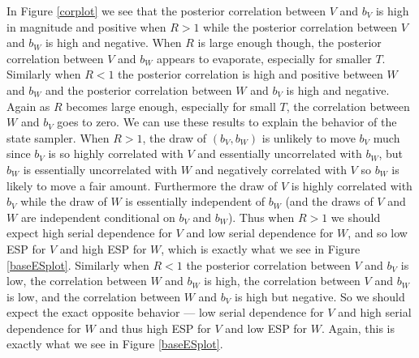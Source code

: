 \documentclass{article}
\begin{document}
In Figure \ref{corplot} we see that the posterior correlation between $V$ and $b_V$ is high in magnitude and positive when $R>1$ while the posterior correlation between $V$ and $b_W$ is high and negative. When $R$ is large enough though, the posterior correlation between $V$ and $b_W$ appears to evaporate, especially for smaller $T$. Similarly when $R<1$ the posterior correlation is high and positive between $W$ and $b_W$ and the posterior correlation between $W$ and $b_V$ is high and negative. Again as $R$ becomes large enough, especially for small $T$, the correlation between $W$ and $b_V$ goes to zero. We can use these results to explain the behavior of the state sampler. When $R>1$, the draw of $(b_V, b_W)$ is unlikely to move $b_V$ much since $b_V$ is so highly correlated with $V$ and essentially uncorrelated with $b_W$, but $b_W$ is essentially uncorrelated with $W$ and negatively correlated with $V$ so $b_W$ is likely to move a fair amount. Furthermore the draw of $V$ is highly correlated with $b_V$ while the draw of $W$ is essentially independent of $b_W$ (and the draws of $V$ and $W$ are independent conditional on $b_V$ and $b_W$). Thus when $R>1$ we should expect high serial dependence for $V$ and low serial dependence for $W$, and so low ESP for $V$ and high ESP for $W$, which is exactly what we see in Figure \ref{baseESplot}. Similarly when $R<1$ the posterior correlation between $V$ and $b_V$ is low, the correlation between $W$ and $b_W$ is high, the correlation between $V$ and $b_W$ is low, and the correlation between $W$ and $b_V$ is high but negative. So we should expect the exact opposite behavior --- low serial dependence for $V$ and high serial dependence for $W$ and thus high ESP for $V$ and low ESP for $W$. Again, this is exactly what we see in Figure \ref{baseESplot}.
\end{document}
